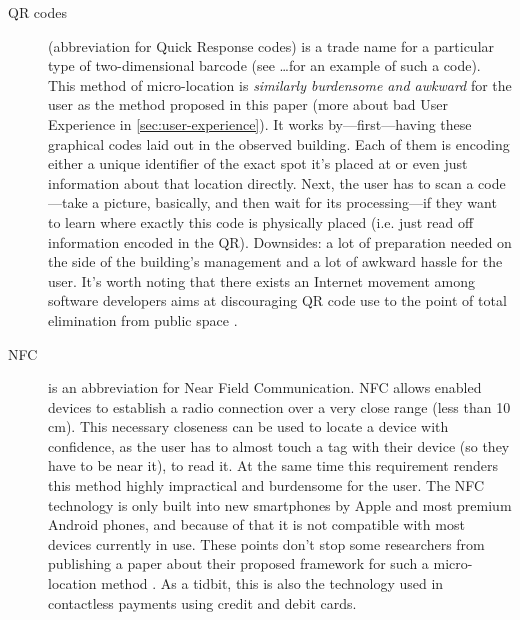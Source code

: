 \begin{description}
	\item[QR codes] (abbreviation for Quick Response codes) is a trade name for a particular type of two-dimensional barcode (see  \ldots for an example of such a code). This method of micro-location is \emph{similarly burdensome and awkward} for the user as the method proposed in this paper (more about bad User Experience in \cref{sec:user-experience}). It works by---first---having these graphical codes laid out in the observed building. Each of them is encoding either a unique identifier of the exact spot it's placed at or even just information about that location directly. Next, the user has to scan a code---take a picture, basically, and then wait for its processing---if they want to learn where exactly this code is physically placed (i.e. just read off information encoded in the QR). Downsides: a lot of preparation needed on the side of the building's management and a lot of awkward hassle for the user. It's worth noting that there exists an Internet movement among software developers aims at discouraging QR code use to the point of total elimination from public space \cite{should-i-use-qr}.
	
	\item[NFC] is an abbreviation for Near Field Communication. NFC allows enabled devices to establish a radio connection over a very close range (less than 10 cm). This necessary closeness can be used to locate a device with confidence, as the user has to almost touch a tag with their device (so they have to be near it), to read it. At the same time this requirement renders this method highly impractical and burdensome for the user. The NFC technology is only built into new smartphones by Apple and most premium Android phones, and because of that it is not compatible with most devices currently in use. These points don't stop some researchers from publishing a paper about their proposed framework for such a micro-location method \cite{nfc-ulocation}. As a tidbit, this is also the technology used in contactless payments using credit and debit cards.
	
\end{description}

